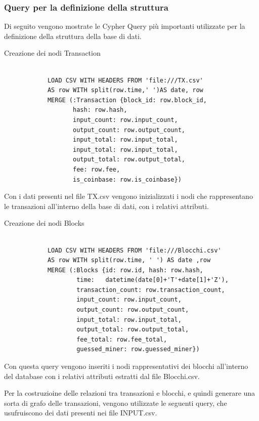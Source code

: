 \subsubsection{Query per la definizione della struttura}
Di seguito vengono mostrate le Cypher Query più importanti utilizzate per la definizione della struttura della base di dati.

\begin{center}
Creazione dei nodi Transaction
   \begin{lstlisting}

            LOAD CSV WITH HEADERS FROM 'file:///TX.csv'
            AS row WITH split(row.time,' ')AS date, row
            MERGE (:Transaction {block_id: row.block_id, 
                   hash: row.hash,
                   input_count: row.input_count,
                   output_count: row.output_count, 
                   input_total: row.input_total, 
                   input_total: row.input_total,  
                   output_total: row.output_total, 
                   fee: row.fee,
                   is_coinbase: row.is_coinbase})
\end{lstlisting} 
\end{center}
Con i dati presenti nel file TX.csv vengono inizializzati i nodi che rappresentano le transazioni all'interno della base di dati, con i relativi attributi.
\newpage \thispagestyle{mystyle}
\begin{center}
Creazione dei nodi Blocks
   \begin{lstlisting}

            LOAD CSV WITH HEADERS FROM 'file:///Blocchi.csv'
            AS row WITH split(row.time, ' ') AS date ,row
            MERGE (:Blocks {id: row.id, hash: row.hash, 
                    time:   datetime(date[0]+'T'+date[1]+'Z'),
                    transaction_count: row.transaction_count, 
                    input_count: row.input_count, 
                    output_count: row.output_count,
                    input_total: row.input_total,  
                    output_total: row.output_total, 
                    fee_total: row.fee_total,
                    guessed_miner: row.guessed_miner})
\end{lstlisting} 
\end{center}
 Con questa query vengono inseriti i nodi rappresentativi dei blocchi all'interno del database con i relativi attributi estratti dal file Blocchi.csv.
 
 Per la costruzioine delle relazioni tra transazioni e blocchi, e quindi generare una sorta di grafo delle transazioni, vengono utilizzate le seguenti query, che usufruiscono dei dati presenti nei file INPUT.csv.

